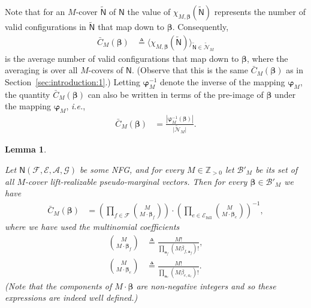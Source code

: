 \documentclass[journal, twocolumn]{IEEEtran}
\renewcommand{\mathbf}[1]{{\bm{#1}}}
\newcommand{\ie}{\emph{i.e.}}
\newcommand{\Z}{\mathbb{Z}}
\newcommand{\Zpp}{\Z_{>0}}
\newcommand{\vect}[1]{\mathbf{#1}}
\newcommand{\set}[1]{\mathcal{#1}}
\newcommand{\graph}[1]{\mathsf{#1}}
\newcommand{\defeq}{\triangleq}
\newcommand{\bel}{\beta}
\newcommand{\vbel}{\boldsymbol{\bel}}
\newcommand{\setA}{\set{A}}
\newcommand{\setE}{\set{E}}
\newcommand{\setEfull}{\set{E}_{\mathrm{full}}}
\newcommand{\setF}{\set{F}}
\newcommand{\setG}{\set{G}}
\newcommand{\va}{\vect{a}}
\newcommand{\lmpBdown}[1]{\mathcal{B}'_{#1}}
\newcommand{\graphN}{\graph{N}}
\newcommand{\cover}[1]{\tilde{#1}}
\newcommand{\cset}[1]{\cover{\set{#1}}}
\newcommand{\cgraph}[1]{\cover{\graph{#1}}}
\newcommand{\card}[1]{\left\lvert #1 \right\rvert}
\newcommand{\cardbig}[1]{\big\lvert #1 \big\rvert}
\newcommand{\?}{\mathrm{?}}
\newcommand{\varphiM}{\boldsymbol{\varphi}_{M}}
\newtheorem{Lemma}{Lemma}
\begin{document}
Note that for an $M$-cover $\cgraph{N}$ of $\graphN$ the value of
$\chi_{M,\vbel}(\cgraph{N})$ represents the number of valid configurations in
$\cgraph{N}$ that map down to $\vbel$. Consequently,
\begin{align}
  \bar C_M(\vbel)
    &\defeq 
       \Big\langle
         \chi_{M,\vbel}(\cgraph{N})
       \Big\rangle_{\cgraph{N} \in \cset{N}_M}
         \label{eq:def:C:bar:1}
\end{align}
is the average number of valid configurations that map down to $\vbel$, where
the averaging is over all $M$-covers of $\graph{N}$. (Observe that this is the
same $\bar C_M(\vbel)$ as in Section~\ref{sec:introduction:1}.) Letting
$\varphiM^{-1}$ denote the inverse of the mapping $\varphiM$, the quantity
$\bar C_M(\vbel)$ can also be written in terms of the pre-image of $\vbel$
under the mapping $\varphiM$, \ie,
\begin{align*}
  \bar C_M(\vbel)
    &= \frac{\card{\varphiM^{-1}({\vbel})}}
            {\cardbig{\cset{N}_M}}.
\end{align*}


\begin{Lemma}
  \label{lemma:average:number:pre:images:in:graph:covers:1}

  Let $\graphN(\setF,\setE, \setA, \setG)$ be some NFG, and for every $M \in
  \Zpp$ let $\lmpBdown{M}$ be its set of all $M$-cover lift-realizable
  pseudo-marginal vectors. Then for every $\vbel \in \lmpBdown{M}$ we have
  \begin{align*}
    \bar C_M(\vbel)
      &= \left(
           \prod_{f \in \setF}\!
             {M \choose M \cdot \vbel_f}
         \right)
         \!\cdot\!
         \left(
           \prod_{e \in \setEfull}\!\!
             {M \choose M \cdot \vbel_e}
         \right)^{-1},
  \end{align*}
  where we have used the multinomial coefficients
  \begin{align}
    {M \choose M \cdot \vbel_f}
      &\defeq
         \frac{M!}
         {\prod_{\va_f} (M \bel_{f,\va_f})!},
           \label{eq:M:choose:bel:1} \\
    {M \choose M \cdot \vbel_e}
      &\defeq
         \frac{M!}
         {\prod_{\va_e} (M \bel_{e,a_e})!}.
           \label{eq:M:choose:bel:2}
  \end{align}
  (Note that the components of $M \cdot \vbel$ are non-negative integers and
  so these expressions are indeed well defined.)
\end{Lemma}
\end{document}
